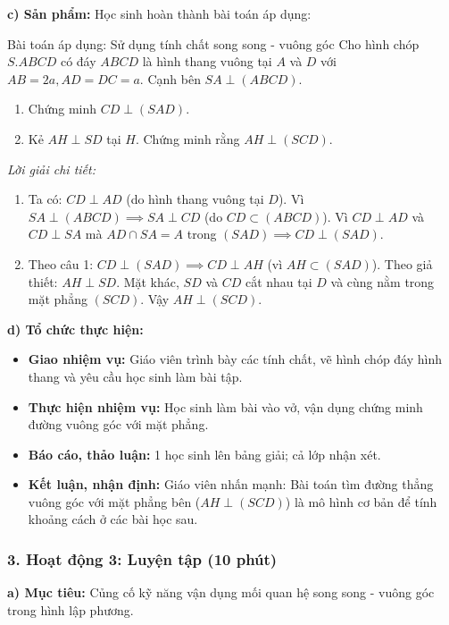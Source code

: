 \documentclass[12pt, a4paper]{article}
\begin{document}
\noindent \textbf{c) Sản phẩm:}
Học sinh hoàn thành bài toán áp dụng:
\begin{pedabox}{Bài toán áp dụng: Sử dụng tính chất song song - vuông góc}
Cho hình chóp $S.ABCD$ có đáy $ABCD$ là hình thang vuông tại $A$ và $D$ với $AB = 2a, AD = DC = a$. Cạnh bên $SA \perp (ABCD)$.
\begin{enumerate}[leftmargin=0.6cm]
    \item Chứng minh $CD \perp (SAD)$.
    \item Kẻ $AH \perp SD$ tại $H$. Chứng minh rằng $AH \perp (SCD)$.
\end{enumerate}
\end{pedabox}
\textit{Lời giải chi tiết:}
\begin{enumerate}[leftmargin=0.6cm]
    \item Ta có: $CD \perp AD$ (do hình thang vuông tại $D$).
    Vì $SA \perp (ABCD) \implies SA \perp CD$ (do $CD \subset (ABCD)$).
    Vì $CD \perp AD$ và $CD \perp SA$ mà $AD \cap SA = A$ trong $(SAD) \implies CD \perp (SAD)$.
    \item Theo câu 1: $CD \perp (SAD) \implies CD \perp AH$ (vì $AH \subset (SAD)$).
    Theo giả thiết: $AH \perp SD$.
    Mặt khác, $SD$ và $CD$ cắt nhau tại $D$ và cùng nằm trong mặt phẳng $(SCD)$.
    Vậy $AH \perp (SCD)$.
\end{enumerate}

\noindent \textbf{d) Tổ chức thực hiện:}
\begin{itemize}[leftmargin=0.6cm]
    \item \textbf{Giao nhiệm vụ:} Giáo viên trình bày các tính chất, vẽ hình chóp đáy hình thang và yêu cầu học sinh làm bài tập.
    \item \textbf{Thực hiện nhiệm vụ:} Học sinh làm bài vào vở, vận dụng chứng minh đường vuông góc với mặt phẳng.
    \item \textbf{Báo cáo, thảo luận:} 1 học sinh lên bảng giải; cả lớp nhận xét.
    \item \textbf{Kết luận, nhận định:} Giáo viên nhấn mạnh: Bài toán tìm đường thẳng vuông góc với mặt phẳng bên ($AH \perp (SCD)$) là mô hình cơ bản để tính khoảng cách ở các bài học sau.
\end{itemize}

\subsubsection*{3. Hoạt động 3: Luyện tập (10 phút)}

\noindent \textbf{a) Mục tiêu:}
Củng cố kỹ năng vận dụng mối quan hệ song song - vuông góc trong hình lập phương.
\end{document}
